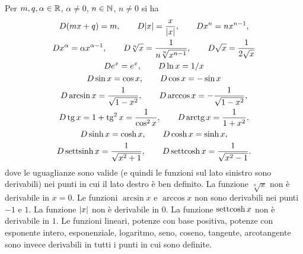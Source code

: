 \begin{theorem}%
\label{th:derivate_elementari}%
%
\mymark{**}%
Per $m,q,\alpha \in \mathbb R$, $\alpha \neq 0$, $n\in \mathbb N$, $n\neq 0$
si ha
\begin{gather*}
D (mx + q) = m, \qquad
D {\left|x\right|} = \frac{x}{{\left|x\right|}}, \qquad
D x^n = n x^{n-1}, \\
D x^\alpha = \alpha x^{\alpha -1}, \qquad
D \sqrt[n]{x} = \frac{1}{n\sqrt[n]{x^{n-1}}}, \qquad
D \sqrt{x} = \frac{1}{2\sqrt{x}}
\\
D e^x = e^x, \qquad
D \ln x = 1/x \\
D \sin x = \cos x, \qquad D \cos x = -\sin x\\
D \arcsin x =  \frac{1}{\sqrt{1-x^2}}, \qquad
D \arccos x = -\frac{1}{\sqrt{1-x^2}},\\
D \operatorname{tg} x = 1+ \operatorname{tg}^2 x = \frac{1}{\cos^2 x},
\qquad D \operatorname{arctg} x = \frac{1}{1+x^2},\\
D \sinh x = \cosh x,
\qquad D \cosh x = \sinh x,\\
D \operatorname{settsinh} x = \frac{1}{\sqrt{x^2+1}}, \qquad
D \operatorname{settcosh} x = \frac{1}{\sqrt{x^2-1}}.
\end{gather*}
dove le uguaglianze sono valide (e quindi le funzioni sul lato sinistro sono derivabili) nei punti in cui il lato destro è ben definito.
La funzione $\sqrt[n]{x}$
non è derivabile in $x=0$.
Le funzioni $\arcsin x$ e $\arccos x$ non sono derivabili nei punti $-1$ e $1$.
La funzione ${\left|x\right|}$ non è derivabile in $0$.
La funzione $\operatorname{settcosh} x$ non è derivabile in $1$.
Le funzioni lineari, potenze con base positiva, potenze con esponente intero,
esponenziale, logaritmo, seno, coseno, tangente, arcotangente sono invece derivabili
in tutti i punti in cui sono definite.
\end{theorem}

